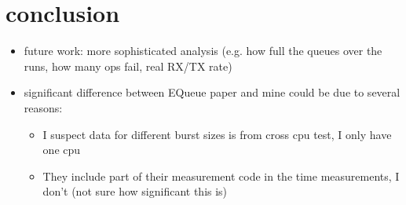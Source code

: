 \section{conclusion}
\begin{itemize}
    \item future work: more sophisticated analysis (e.g. how full the queues over the runs, how many ops fail, real RX/TX rate)
    \item significant difference between EQueue paper and mine could be due to several reasons:
        \begin{itemize}
            \item I suspect data for different burst sizes is from cross cpu test, I only have one cpu
            \item They include part of their measurement code in the time measurements, I don't (not sure how significant this is)
        \end{itemize}
\end{itemize}
